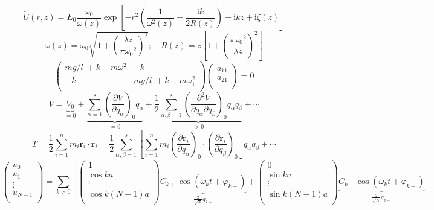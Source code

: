 \documentclass{article}
\def\ii{\mathrm{i}}
\def\bm{\symbf}
\begin{document}
\[\tilde{U}(r,z)=E_0\dfrac{\omega_0}{\omega(z)}\exp\left[-r^2\left(\dfrac{1}{\omega^2(z)}+\dfrac{\ii k}{2R(z)}\right)-\ii k z+\ii \zeta(z)\right]\]
\[\omega(z)=\omega_0\sqrt{1+\left(\dfrac{\lambda z}{\pi {\omega_0}^2}\right)^2};\quad R(z)=z\left[1+\left(\dfrac{\pi {\omega_0}^2}{\lambda z}\right)^2\right]\]
\[\left( \begin{matrix}
{mg}/{l}\;+k-m\omega _{1}^{2} & -k  \\
-k & {mg}/{l}\;+k-m\omega _{1}^{2}  \\
\end{matrix} \right)\left( \begin{matrix}
{{a}_{11}}  \\
{{a}_{21}}  \\
\end{matrix} \right)=0\]
\[V=\underbrace{{{V}_{0}}}_{=0}+\underbrace{\sum\limits_{\alpha =1}^{s}{{{\left( \frac{\partial V}{\partial {{q}_{\alpha }}} \right)}_{0}}{{q}_{\alpha }}}}_{=0}+\underbrace{\frac{1}{2}\sum\limits_{\alpha ,\beta =1}^{s}{{{\left( \frac{{{\partial }^{2}}V}{\partial {{q}_{\alpha }}\partial {{q}_{\beta }}} \right)}_{0}}{{q}_{\alpha }}{{q}_{\beta }}}}_{>0}+\cdots \]
\[T=\frac{1}{2}\sum\limits_{i=1}^{n}{{{m}_{i}}{{{\dot{\bm r}}}_{i}}\cdot {{{\dot{\bm r}}}_{i}}}=\frac{1}{2}\sum\limits_{\alpha ,\beta =1}^{s}{\left[ \sum\limits_{i=1}^{n}{{{m}_{i}}{{\left( \frac{\partial {{\bm r}_{i}}}{\partial {{q}_{\alpha }}} \right)}_{0}}\cdot {{\left( \frac{\partial {{\bm r}_{i}}}{\partial {{q}_{\beta }}} \right)}_{0}}} \right]{{{\dot{q}}}_{\alpha }}{{{\dot{q}}}_{\beta }}}+\cdots \]
\[\left( \begin{matrix}
{{u}_{0}}  \\
{{u}_{1}}  \\
\vdots   \\
{{u}_{N-1}}  \\
\end{matrix} \right)=\sum\limits_{k>0}{\left[ \left( \begin{matrix}
	1  \\
	\cos ka  \\
	\vdots   \\
	\cos k\left( N-1 \right)a  \\
	\end{matrix} \right)\underbrace{{{C}_{k+}}\cos \left( {{\omega }_{k}}t+{{\varphi }_{k+}} \right)}_{\frac{2}{\sqrt{N}}{{q}_{k+}}}+\left( \begin{matrix}
	0  \\
	\sin ka  \\
	\vdots   \\
	\sin k\left( N-1 \right)a  \\
	\end{matrix} \right)\underbrace{{{C}_{k-}}\cos \left( {{\omega }_{k}}t+{{\varphi }_{k-}} \right)}_{\frac{2}{\sqrt{N}}{{q}_{k-}}} \right]}\]
\end{document}
